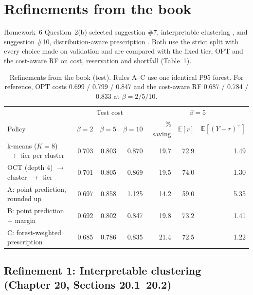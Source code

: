 \documentclass[10pt]{article}
\newcommand{\Ex}{\mathbb{E}}
\begin{document}
\section{Refinements from the book}
\label{sec:refine}

Homework~6 Question~2(b) selected suggestion \#7, interpretable clustering \citep[Ch.~20, \S\S20.1--20.2]{bertsimas2019mlopt}, and suggestion \#10, distribution-aware prescription \citep[Ch.~13, \S\S13.1--13.2]{bertsimas2019mlopt}. Both use the strict split with every choice made on validation and are compared with the fixed tier, OPT and the cost-aware RF on cost, reservation and shortfall (Table~\ref{tab:refine}).

\begin{table}[t]
\centering\small
\caption{Refinements from the book (test). Rules A--C use one identical P95 forest. For reference, OPT costs 0.699 / 0.799 / 0.847 and the cost-aware RF 0.687 / 0.784 / 0.833 at $\beta=2/5/10$.}
\label{tab:refine}
\setlength{\tabcolsep}{5pt}
\begin{tabular}{lrrr|rrr}
\toprule
 & \multicolumn{3}{c|}{Test cost} & \multicolumn{3}{c}{$\beta=5$} \\
Policy & $\beta{=}2$ & $\beta{=}5$ & $\beta{=}10$ & \% saving & $\Ex[r]$ & $\Ex[(Y{-}r)^+]$ \\
\midrule
k-means ($K=8$) $\to$ tier per cluster & 0.703 & 0.803 & 0.870 & 19.7 & 72.9 & 1.49 \\
OCT (depth 4) $\to$ cluster $\to$ tier & 0.701 & 0.805 & 0.869 & 19.5 & 74.0 & 1.30 \\
\midrule
A: point prediction, rounded up & 0.697 & 0.858 & 1.125 & 14.2 & 59.0 & 5.35 \\
B: point prediction + margin & 0.692 & 0.802 & 0.847 & 19.8 & 73.2 & 1.41 \\
C: forest-weighted prescription & 0.685 & 0.786 & 0.835 & 21.4 & 72.5 & 1.22 \\
\bottomrule
\end{tabular}
\end{table}

\subsection{Refinement 1: Interpretable clustering (Chapter 20, Sections 20.1--20.2)}
\end{document}
